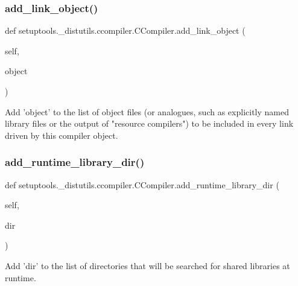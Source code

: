 \subsubsection{\texorpdfstring{add\+\_\+link\+\_\+object()}{add\_link\_object()}}
{\footnotesize\ttfamily def setuptools.\+\_\+distutils.\+ccompiler.\+C\+Compiler.\+add\+\_\+link\+\_\+object (\begin{DoxyParamCaption}\item[{}]{self,  }\item[{}]{object }\end{DoxyParamCaption})}

\begin{DoxyVerb}Add 'object' to the list of object files (or analogues, such as
explicitly named library files or the output of "resource
compilers") to be included in every link driven by this compiler
object.
\end{DoxyVerb}
 \mbox{\label{classsetuptools_1_1__distutils_1_1ccompiler_1_1CCompiler_a2c8b583eaf660def7cf3a33afe2d27d8}} 
\subsubsection{\texorpdfstring{add\+\_\+runtime\+\_\+library\+\_\+dir()}{add\_runtime\_library\_dir()}}
{\footnotesize\ttfamily def setuptools.\+\_\+distutils.\+ccompiler.\+C\+Compiler.\+add\+\_\+runtime\+\_\+library\+\_\+dir (\begin{DoxyParamCaption}\item[{}]{self,  }\item[{}]{dir }\end{DoxyParamCaption})}

\begin{DoxyVerb}Add 'dir' to the list of directories that will be searched for
shared libraries at runtime.
\end{DoxyVerb}
 \mbox{\label{classsetuptools_1_1__distutils_1_1ccompiler_1_1CCompiler_a501761e2a8ba78e759bf2242efe4ba54}} 
